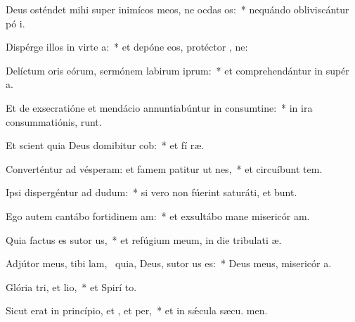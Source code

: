 \item Deus osténdet mihi super inimícos meos, ne ocdas os:~* nequándo obliviscántur pó i.
\item Dispérge illos in virte a:~* et depóne eos, protéctor , ne:
\item Delíctum oris eórum, sermónem labirum iprum:~* et comprehendántur in supér a.
\item Et de exsecratióne et mendácio annuntiabúntur in consumtine:~* in ira consummatiónis,   runt.
\item Et scient quia Deus domibitur cob:~* et fí ræ.
\item Converténtur ad vésperam: et famem patitur ut nes,~* et circuíbunt tem.
\item Ipsi dispergéntur ad dudum:~* si vero non fúerint saturáti, et bunt.
\item Ego autem cantábo fortidinem am:~* et exsultábo mane misericór am.
\item Quia factus es sutor us,~* et refúgium meum, in die tribulati æ.
\item Adjútor meus, tibi lam,~\pscross{} quia, Deus, sutor us es:~* Deus meus, misericór a.
\item Glória tri, et lio,~* et Spirí to.
\item Sicut erat in princípio, et , et per,~* et in sǽcula sæcu. men.
